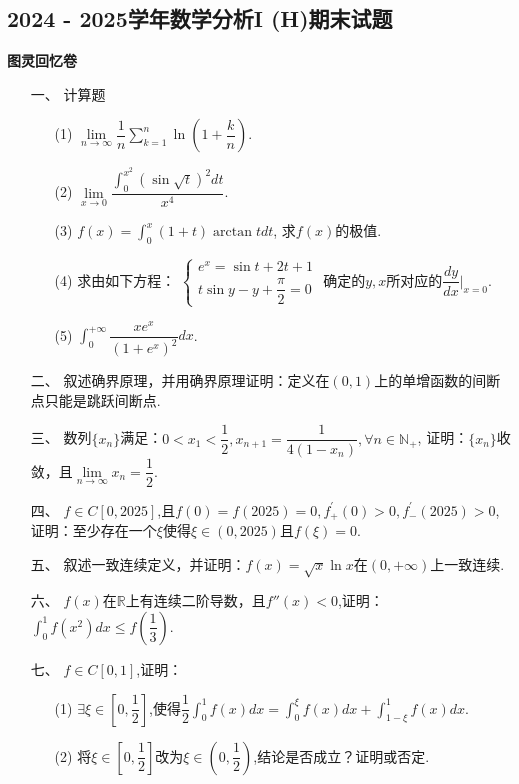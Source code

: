 \documentclass{ctexbook}
\begin{document}
\centering
\subsection*{2024 - 2025学年数学分析I (H)期末试题}
\centering
\textbf{图灵回忆卷}

\begin{enumerate}[leftmargin=*,labelwidth=!,labelsep=0pt]
    \item[一、]计算题
    \begin{enumerate}[leftmargin=*,labelwidth=!,labelsep=0pt]
        \item[(1)] \(\lim\limits_{n\to\infty}\dfrac{1}{n}\displaystyle\sum\limits_{k=1}^{n}\ln\left(1+\dfrac{k}{n}\right)\).
        \item[(2)] \(\lim\limits_{x\to0}\dfrac{\int_{0}^{x^{2}}\left(\sin{\sqrt{t}}\right)^{2}dt}{x^{4}}\).
        \item[(3)] \(f(x)=\int_{0}^{x}\left(1+t\right)\arctan tdt\), 求\(f(x)\)的极值.
        \item[(4)] 求由如下方程：
            \(
            \begin{cases}
                e^{x}=\sin t+2t+1\\
                t\sin y-y+\dfrac{\pi}{2}=0
            \end{cases}
            \)
            确定的\(y,x\)所对应的\(\dfrac{dy}{dx}\vert_{x = 0}\).
        \item[(5)] \(\int_{0}^{+\infty}\dfrac{xe^{x}}{\left(1+e^{x}\right)^{2}}dx\).
    \end{enumerate}

    \item[二、]叙述确界原理，并用确界原理证明：定义在\((0,1)\)上的单增函数的间断点只能是跳跃间断点.
    
    \item[三、]数列\(\{x_n\}\)满足：\(0<x_{1}<\dfrac{1}{2},x_{n+1}=\dfrac{1}{4(1-x_{n})},\forall n \in \mathbb{N_+}\),
    证明：\(\{x_n\}\)收敛，且\(\lim\limits_{n\to\infty}x_{n}=\dfrac{1}{2}\).
    
    \item[四、]\(f\in C[0,2025]\),且\(f(0)=f(2025)=0,f_{+}^{\prime}(0)>0,f_{-}^{\prime}(2025)>0\),
    证明：至少存在一个\(\xi\)使得\(\xi\in(0,2025)\)且\(f(\xi)=0\).

    \item[五、]叙述一致连续定义，并证明：\(f(x)=\sqrt{x}\ln x\)在\((0,+\infty)\)上一致连续.
    
    \item[六、]\(f(x)\)在\(\mathbb{R}\)上有连续二阶导数，且\(f''(x)<0\),证明：\(\int_{0}^{1}f(x^{2})dx\leq f(\dfrac{1}{3})\).
    
    \item[七、]\(f\in C[0,1]\),证明：
    \begin{enumerate}[leftmargin=*,labelwidth=!,labelsep=0pt]
        \item[(1)] \(\exists\xi\in[0,\dfrac{1}{2}]\),使得\(\dfrac{1}{2}\int_{0}^{1}f(x)dx=\int_{0}^{\xi}f(x)dx+\int_{1-\xi}^{1}f(x)dx\).
        \item[(2)] 将\(\xi\in[0,\dfrac{1}{2}]\)改为\(\xi\in(0,\dfrac{1}{2})\),结论是否成立？证明或否定.
    \end{enumerate}

\end{enumerate}
\end{document}
